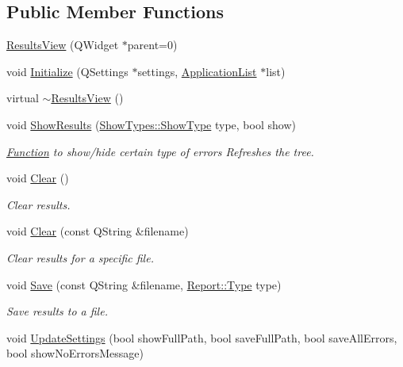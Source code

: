 \subsection*{Public Member Functions}
\begin{DoxyCompactItemize}
\item 
\hyperlink{class_results_view_a73b0bdb3daef4f9b199627c89637c353}{Results\-View} (Q\-Widget $\ast$parent=0)
\item 
void \hyperlink{class_results_view_a41ed150cc2f5ba3cd7417a862a0bb481}{Initialize} (Q\-Settings $\ast$settings, \hyperlink{class_application_list}{Application\-List} $\ast$list)
\item 
virtual \hyperlink{class_results_view_af9caa8995848c6e05e8486ad1aac8856}{$\sim$\-Results\-View} ()
\item 
void \hyperlink{class_results_view_a1d8fbf9d78611154ac5cb3ea6e921b0f}{Show\-Results} (\hyperlink{class_show_types_a92c368f2a33741268265ac2d931eae3f}{Show\-Types\-::\-Show\-Type} type, bool show)
\begin{DoxyCompactList}\small\item\em \hyperlink{class_function}{Function} to show/hide certain type of errors Refreshes the tree. \end{DoxyCompactList}\item 
void \hyperlink{class_results_view_a71e7b659154c0e1d30089c1cdcfa1dbb}{Clear} ()
\begin{DoxyCompactList}\small\item\em Clear results. \end{DoxyCompactList}\item 
void \hyperlink{class_results_view_aced7249d384605f171774b868771d2ec}{Clear} (const Q\-String \&filename)
\begin{DoxyCompactList}\small\item\em Clear results for a specific file. \end{DoxyCompactList}\item 
void \hyperlink{class_results_view_a7883371e521591a9a0eb3dccbcbf6e38}{Save} (const Q\-String \&filename, \hyperlink{class_report_a7849fcf198f06b2f94420312e43ec10c}{Report\-::\-Type} type)
\begin{DoxyCompactList}\small\item\em Save results to a file. \end{DoxyCompactList}\item 
void \hyperlink{class_results_view_ade996d48f9c5a82ae8839445336120ba}{Update\-Settings} (bool show\-Full\-Path, bool save\-Full\-Path, bool save\-All\-Errors, bool show\-No\-Errors\-Message)

\end{DoxyCompactItemize}

